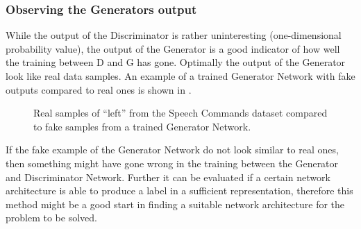 \subsubsection{Observing the Generators output}
While the output of the Discriminator is rather uninteresting (one-dimensional probability value), the output of the Generator is a good indicator of how well the training between D and G has gone.
Optimally the output of the Generator look like real data samples.
An example of a trained Generator Network with fake outputs compared to real ones is shown in .

\begin{figure}[!ht]
  \centering
  \caption{Real samples of \enquote{left} from the Speech Commands dataset compared to fake samples from a trained Generator Network.}
  \label{fig:ml_adv_gen}
\end{figure}
\FloatBarrier
\noindent

If the fake example of the Generator Network do not look similar to real ones, then something might have gone wrong in the training between the Generator and Discriminator Network.
Further it can be evaluated if a certain network architecture is able to produce a label in a sufficient representation, therefore this method might be a good start in finding a suitable network architecture for the problem to be solved.



